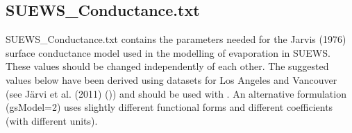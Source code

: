 \documentclass[letterpaper,10pt,english]{sphinxmanual}
\begin{document}
\subsection{SUEWS\_Conductance.txt}
\label{\detokenize{input_files/SUEWS_SiteInfo/SUEWS_Conductance::doc}}\label{\detokenize{input_files/SUEWS_SiteInfo/SUEWS_Conductance:suews-conductance-txt}}
SUEWS\_Conductance.txt contains the parameters needed for the Jarvis
(1976) surface conductance model used in the modelling of evaporation in
SUEWS. These values should  be changed independently of each
other. The suggested values below have been derived using datasets for
Los Angeles and Vancouver (see Järvi et al. (2011) \label{\detokenize{input_files/SUEWS_SiteInfo/SUEWS_Conductance:id1}}{\hyperref[\detokenize{references:j11}]{\sphinxcrossref{{[}J11{]}}}} ()) and should be
used with . An alternative formulation (gsModel=2) uses
slightly different functional forms and different coefficients (with
different units).
\end{document}
